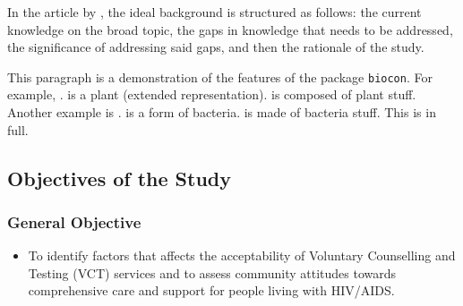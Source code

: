 \documentclass{strrespaper-trad}
\begin{document}
			In the article  by \citeauthor{sachdevHowWriteBackground2018}, the ideal background is structured as follows: the current knowledge on the broad topic, the gaps in knowledge that needs to be addressed, the significance of addressing said gaps, and then the rationale of the study.

			This paragraph is a demonstration of the features of the package \texttt{biocon}. For example, .
			 is a plant (extended representation).
			 is composed of plant stuff.
			Another example is .
			 is a form of bacteria.
			 is made of bacteria stuff.
			This is  in full.

			\Blindtext[2]

		\subsection{Objectives of the Study}
			\nocite{theopenuniversityHealthManagementEthics2017}
			\subsubsection{General Objective}
				\begin{itemize}
					\item To identify factors that affects the acceptability of Voluntary Counselling and Testing (VCT) services and to assess community attitudes towards comprehensive care and support for people living with HIV/AIDS.
				\end{itemize}
\end{document}
